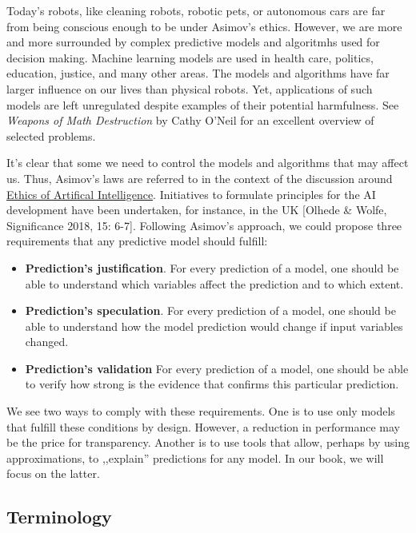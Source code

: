 \documentclass[]{krantz}
\providecommand{\tightlist}{%
  \setlength{\itemsep}{0pt}\setlength{\parskip}{0pt}}
\theoremstyle{definition}
\theoremstyle{definition}
\theoremstyle{definition}
\theoremstyle{remark}
\begin{document}
Today's robots, like cleaning robots, robotic pets, or autonomous cars
are far from being conscious enough to be under Asimov's ethics.
However, we are more and more surrounded by complex predictive models
and algoritmhs used for decision making. Machine learning models are
used in health care, politics, education, justice, and many other areas.
The models and algorithms have far larger influence on our lives than
physical robots. Yet, applications of such models are left unregulated
despite examples of their potential harmfulness. See \emph{Weapons of
Math Destruction} by Cathy O'Neil \citep{ONeil} for an excellent
overview of selected problems.

It's clear that some we need to control the models and algorithms that
may affect us. Thus, Asimov's laws are referred to in the context of the
discussion around
\href{https://en.wikipedia.org/wiki/Ethics_of_artificial_intelligence}{Ethics
of Artifical Intelligence}. Initiatives to formulate principles for the
AI development have been undertaken, for instance, in the UK {[}Olhede
\& Wolfe, Significance 2018, 15: 6-7{]}. Following Asimov's approach, we
could propose three requirements that any predictive model should
fulfill:

\begin{itemize}
\tightlist
\item
  \textbf{Prediction's justification}. For every prediction of a model,
  one should be able to understand which variables affect the prediction
  and to which extent.
\item
  \textbf{Prediction's speculation}. For every prediction of a model,
  one should be able to understand how the model prediction would change
  if input variables changed.
\item
  \textbf{Prediction's validation} For every prediction of a model, one
  should be able to verify how strong is the evidence that confirms this
  particular prediction.
\end{itemize}

We see two ways to comply with these requirements. One is to use only
models that fulfill these conditions by design. However, a reduction in
performance may be the price for transparency. Another is to use tools
that allow, perhaps by using approximations, to ,,explain'' predictions
for any model. In our book, we will focus on the latter.

\hypertarget{terminology}{%
\subsection{Terminology}\label{terminology}}
\end{document}
